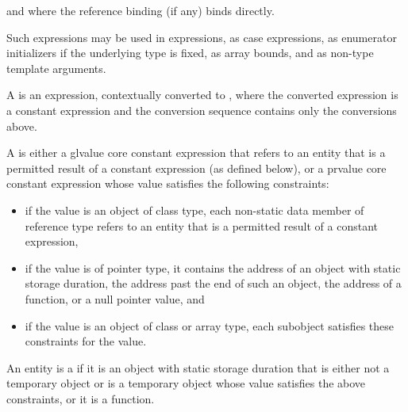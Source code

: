 and where the reference binding (if any) binds directly.
\begin{note}
Such expressions may be used in 
expressions, as case expressions,
as enumerator initializers if the underlying type is
fixed, as array bounds, and
as non-type template
arguments.
\end{note}
%
%
A  is
an expression, contextually converted to ,
where the converted expression is a constant expression and
the conversion sequence contains only the conversions above.

\pnum
A  is either
a glvalue core constant expression that refers to
an entity that is a permitted result of a constant expression (as defined below), or
a prvalue core constant expression whose value
satisfies the following constraints:

\begin{itemize}
  \item
  if the value is an object of class type,
  each non-static data member of reference type refers to
  an entity that is a permitted result of a constant expression,

  \item
  if the value is of pointer type, it contains
  the address of an object with static storage duration,
  the address past the end of such an object,
  the address of a function,
  or a null pointer value, and

  \item
  if the value is an object of class or array type,
  each subobject satisfies these constraints for the value.
\end{itemize}
An entity is a
if it is an
object with static storage duration that is either not a temporary object or is
a temporary object whose value satisfies the above constraints, or it is a
function.

